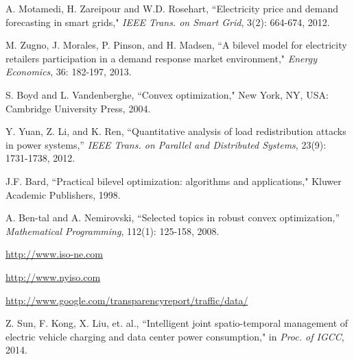 \documentclass[journal]{IEEEtran}
\begin{document}
\begin{thebibliography}{1}
		A. Motamedi, H. Zareipour and W.D. Rosehart, ``Electricity price and demand forecasting in smart grids," {\it IEEE Trans. on Smart Grid}, 3(2): 664-674, 2012.
				
		M. Zugno, J. Morales, P. Pinson, and H. Madsen, ``A bilevel model for electricity retailers participation in a demand response market environment," {\it Energy Economics}, 36: 182-197, 2013.
		
		S. Boyd and L. Vandenberghe, ``Convex optimization," New York, NY, USA: Cambridge University Press, 2004.
		
		Y. Yuan, Z. Li, and K. Ren, ``Quantitative analysis of load redistribution attacks in power systems,'' {\it IEEE Trans. on Parallel and Distributed Systems}, 23(9): 1731-1738, 2012.
		
		J.F. Bard, ``Practical bilevel optimization: algorithms and applications," Kluwer Academic Publishers, 1998.
		
		A. Ben-tal and A. Nemirovski, “Selected topics in robust convex optimization,” {\it Mathematical Programming}, 112(1): 125-158, 2008.
		
		\url{http://www.iso-ne.com}
		
		\url{http://www.nyiso.com}
		
		\url{http://www.google.com/transparencyreport/traffic/data/}
		
        Z. Sun, F. Kong, X. Liu, et. al., ``Intelligent joint spatio-temporal management of electric vehicle charging and data center power consumption," in {\it Proc. of IGCC}, 2014.
	\end{thebibliography}
	
\end{document}
